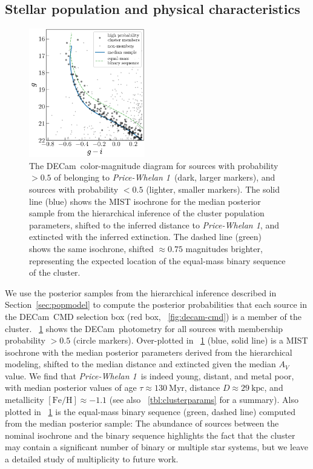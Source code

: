 \documentclass[twocolumn]{aastex62}
\newcommand{\acronym}[1]{{\small{#1}}}
\newcommand{\decam}{DECam}
\newcommand{\sectionname}{Section}
\newcommand{\feh}{\ensuremath{[\textrm{Fe} / \textrm{H}]}}
\newcommand{\clustername}{\textsl{Price-Whelan 1}}
\newcommand{\clage}{\ensuremath{130~\textrm{Myr}}}
\newcommand{\clfeh}{\ensuremath{-1.1}}
\newcommand{\cldist}{\ensuremath{29~\textrm{kpc}}}
\begin{document}
\subsection{Stellar population and physical characteristics}
\label{sec:popchars}

\begin{figure}[htb]
\centering
\includegraphics[width=0.45\textwidth]{figures/hierarch-results.pdf}
\caption{The \decam\ color-magnitude diagram for sources with probability $>0.5$ of belonging to \clustername\ (dark, larger markers), and sources with probability $<0.5$ (lighter, smaller markers).
The solid line (blue) shows the \acronym{MIST} isochrone for the median posterior sample from the hierarchical inference of the cluster population parameters, shifted to the inferred distance to \clustername, and extincted with the inferred extinction.
The dashed line (green) shows the same isochrone, shifted $\approx 0.75$ magnitudes brighter, representing the expected location of the equal-mass binary sequence of the cluster.
}
\label{fig:hierarch-iso}
\end{figure}

We use the posterior samples from the hierarchical inference described in \sectionname~\ref{sec:popmodel} to compute the posterior probabilities that each source in the \decam\ CMD selection box (red box, \figurename~\ref{fig:decam-cmd}) is a member of the cluster.
\figurename~\ref{fig:hierarch-iso} shows the \decam\ photometry for all sources with membership probability $> 0.5$ (circle markers).
Over-plotted in \figurename~\ref{fig:hierarch-iso} (blue, solid line) is a \acronym{MIST} isochrone with the median posterior parameters derived from the hierarchical modeling, shifted to the median distance and extincted given the median $A_V$ value.
We find that \clustername\ is indeed young, distant, and metal poor, with median posterior values of age $\tau \approx \clage$, distance $D \approx \cldist$, and metallicity $\feh \approx \clfeh$ (see also \tablename~\ref{tbl:clusterparams} for a summary).
Also plotted in \figurename~\ref{fig:hierarch-iso} is the equal-mass binary sequence (green, dashed line) computed from the median posterior sample: The abundance of sources between the nominal isochrone and the binary sequence highlights the fact that the cluster may contain a significant number of binary or multiple star systems, but we leave a detailed study of multiplicity to future work.
\end{document}
